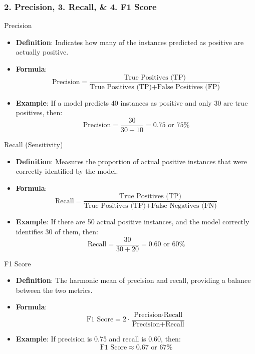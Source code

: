\documentclass[aspectratio=169]{beamer}
\begin{document}
\begin{frame}[fragile]
    \frametitle{2. Precision, 3. Recall, & 4. F1 Score}
    \begin{block}{Precision}
        \begin{itemize}
            \item \textbf{Definition}: Indicates how many of the instances predicted as positive are actually positive.
            \item \textbf{Formula}:
                \[
                \text{Precision} = \frac{\text{True Positives (TP)}}{\text{True Positives (TP)} + \text{False Positives (FP)}}
                \]
            \item \textbf{Example}: If a model predicts 40 instances as positive and only 30 are true positives, then:
                \[
                \text{Precision} = \frac{30}{30 + 10} = 0.75 \text{ or } 75\%
                \]
        \end{itemize}
    \end{block}
    
    \begin{block}{Recall (Sensitivity)}
        \begin{itemize}
            \item \textbf{Definition}: Measures the proportion of actual positive instances that were correctly identified by the model.
            \item \textbf{Formula}:
                \[
                \text{Recall} = \frac{\text{True Positives (TP)}}{\text{True Positives (TP)} + \text{False Negatives (FN)}}
                \]
            \item \textbf{Example}: If there are 50 actual positive instances, and the model correctly identifies 30 of them, then:
                \[
                \text{Recall} = \frac{30}{30 + 20} = 0.60 \text{ or } 60\%
                \]
        \end{itemize}
    \end{block}
    
    \begin{block}{F1 Score}
        \begin{itemize}
            \item \textbf{Definition}: The harmonic mean of precision and recall, providing a balance between the two metrics.
            \item \textbf{Formula}:
                \[
                \text{F1 Score} = 2 \cdot \frac{\text{Precision} \cdot \text{Recall}}{\text{Precision} + \text{Recall}}
                \]
            \item \textbf{Example}: If precision is 0.75 and recall is 0.60, then:
                \[
                \text{F1 Score} \approx 0.67 \text{ or } 67\%
                \]
        \end{itemize}
    \end{block}
\end{frame}
\end{document}

